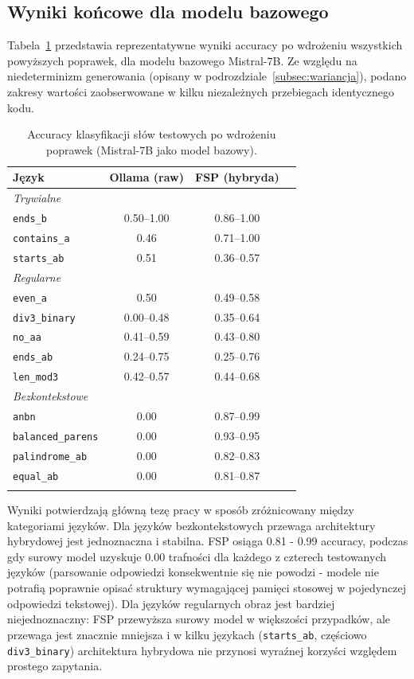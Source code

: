 \documentclass[12pt]{article}
\begin{document}
\subsection{Wyniki końcowe dla modelu bazowego}

Tabela~\ref{tab:benchmark-final} przedstawia reprezentatywne wyniki accuracy po wdrożeniu wszystkich powyższych poprawek, dla modelu bazowego Mistral-7B. Ze względu na niedeterminizm generowania (opisany w podrozdziale~\ref{subsec:wariancja}), podano zakresy wartości zaobserwowane w kilku niezależnych przebiegach identycznego kodu.

\newpage

\begin{longtable}{lccc}
\toprule
\textbf{Język}  & \textbf{Ollama (raw)} & \textbf{FSP (hybryda)} \\
\midrule
\endhead
\multicolumn{4}{l}{\textit{Trywialne}} \\
\texttt{ends\_b}          & 0.50--1.00 & 0.86--1.00 \\
\texttt{contains\_a}      & 0.46       & 0.71--1.00 \\
\texttt{starts\_ab}       & 0.51       & 0.36--0.57 \\
\multicolumn{4}{l}{\textit{Regularne}} \\
\texttt{even\_a}          & 0.50       & 0.49--0.58 \\
\texttt{div3\_binary}     & 0.00--0.48 & 0.35--0.64 \\
\texttt{no\_aa}           & 0.41--0.59 & 0.43--0.80 \\
\texttt{ends\_ab}         & 0.24--0.75 & 0.25--0.76 \\
\texttt{len\_mod3}        & 0.42--0.57 & 0.44--0.68 \\
\multicolumn{4}{l}{\textit{Bezkontekstowe}} \\
\texttt{anbn}             & 0.00 & 0.87--0.99 \\
\texttt{balanced\_parens} & 0.00 & 0.93--0.95 \\
\texttt{palindrome\_ab}   & 0.00 & 0.82--0.83 \\
\texttt{equal\_ab}        & 0.00 & 0.81--0.87 \\
\bottomrule
\caption{Accuracy klasyfikacji słów testowych po wdrożeniu poprawek (Mistral-7B jako model bazowy). }
\label{tab:benchmark-final}
\end{longtable}

Wyniki potwierdzają główną tezę pracy w sposób zróżnicowany między kategoriami języków. Dla języków bezkontekstowych przewaga architektury hybrydowej jest jednoznaczna i stabilna. FSP osiąga 0.81 - 0.99 accuracy, podczas gdy surowy model uzyskuje 0.00 trafności dla każdego z czterech testowanych języków (parsowanie odpowiedzi konsekwentnie się nie powodzi - modele nie potrafią poprawnie opisać struktury wymagającej pamięci stosowej w pojedynczej odpowiedzi tekstowej). Dla języków regularnych obraz jest bardziej niejednoznaczny: FSP przewyższa surowy model w większości przypadków, ale przewaga jest znacznie mniejsza i w kilku językach (\texttt{starts\_ab}, częściowo \texttt{div3\_binary}) architektura hybrydowa nie przynosi wyraźnej korzyści względem prostego zapytania.
\end{document}
